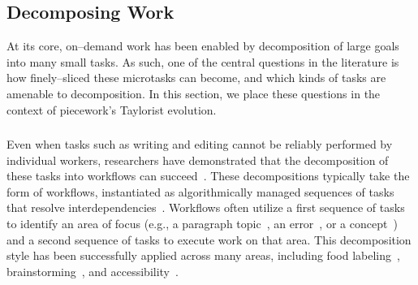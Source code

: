 \documentclass[pn4226]{subfiles}
\begin{document}
\subsection[How far can work be decomposed into smaller microtasks]{Decomposing Work}\label{sec:decomposition}

At its core,
on--demand work has been enabled by decomposition of large goals into many small tasks.
As such,
one of the central questions in the literature is how finely--sliced these microtasks can become, and which kinds of tasks are amenable to decomposition.
In this section,
we place these questions in the context of piecework's Taylorist evolution.

\begin{comment}
Outline:
Crowd work
	- How do we take work and split it up into smaller work?
	- How small can we go?
	- Once we split up, what happens? Marketplace choosing
Piecework
	- How do we take work and split it up?
	[ - how small can we go? ]
	[- Nothing about how people choose. ]
Same/different
	[- task data science ]
	[- Cognitive barriers, task switching, etc, dominates]
	[ - Switching is different, marketplace model ]
\end{comment}

\subsubsection{\crowdworkpers}
Even when tasks such as writing and editing cannot be reliably performed by individual workers,
researchers have demonstrated that
the decomposition of these tasks into workflows can succeed~\cite{crowdForgeKittur,
bernsteinSoylent,
writingMicroTasks,
Nebeling:2016:WCW:2858036.2858169}. 
These decompositions typically take the form of workflows,
instantiated as algorithmically managed sequences of tasks that resolve interdependencies~\cite{Bigham2014}. 
Workflows often utilize a first sequence of tasks to identify an area of focus (e.g.,
a paragraph topic~\cite{crowdForgeKittur},
an error~\cite{bernsteinSoylent},
or a concept~\cite{Yu2016a,Yu2016b}) and a second sequence of tasks to execute work on that area. 
This decomposition style has been successfully applied across many areas,
including food labeling~\cite{noronha2011platemate},
brainstorming~\cite{siangliulue2015toward,Yu2016a},
and accessibility~\cite{lasecki2013chorus,lasecki2012real,Lasecki2011}.
\end{document}
